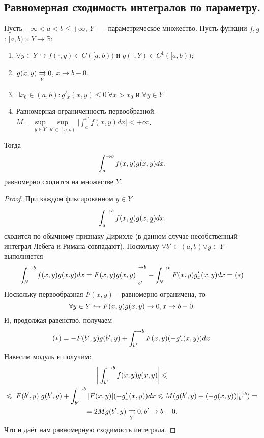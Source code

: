 \subsection{Равномерная сходимость интегралов по параметру.}
\begin{theorem}
    Пусть $-\infty <  a <  b \leq + \infty$, $Y$~---~параметрическое множество.
    Пусть функции $f, g$: $[a, b) \times Y \to \mathbb{R}$:
    \begin{enumerate}
        \item $\forall y \in Y \hookrightarrow f(\cdot, y) \in C([a, b))$ и $g(\cdot, Y) \in C^1([a, b))$;
        \item $g(x, y) \underset{Y}{\rightrightarrows} 0$, $x \rightarrow b - 0$.
        \item $\exists x_0 \in (a, b): g'_x(x, y) \leq 0\  \forall x > x_0$ и $\forall y \in Y$.
        \item Равномерная ограниченность первообразной: $\displaystyle M = \sup\limits_{y \in Y} \sup\limits_{b' \in (a, b)} \biggr|\int_a^{b'}f(x, y)dx\biggr| < +\infty$.
    \end{enumerate}
    Тогда \[
              \int_a^{\rightarrow b} f(x, y)g(x, y)dx.
    \]
    равномерно сходится на множестве $Y$.
\end{theorem}
\begin{proof}
    При каждом фиксированном $\underline{y} \in Y$
    \[
        \int_a^{\rightarrow b}f(x, \underline{y})g(x, \underline{y})dx.
    \]
    сходится по обычному признаку Дирихле (в данном случае несобственный интеграл Лебега и Римана совпадают).
    Поскольку $\forall b' \in (a, b) \forall y \in Y$ выполняется
    \[
        \int_{b'}^{\rightarrow b} f(x, y)g(x. y)dx = F(x, y)g(x, y)\biggr|_{b'}^{\rightarrow b} - \int_{b'}^{\rightarrow b}F(x, y)g'_x(x, y)dx = (*)
    \]
    Поскольку первообразная $F(x, y)$ -- равномерно ограничена, то
    \[
        \forall y \in Y \hookrightarrow F(x, y)g(x, y) \rightarrow 0, x \rightarrow b - 0.
    \]
    И, продолжая равенство, получаем
    \[
        (*) = -F(b', y)g(b', y) + \int_{b'}^{\rightarrow b} F(x, y)(-g'_x(x, y))dx.
    \]
    Навесим модуль и получим:
    \begin{multline*}
        \biggr|\int_{b'}^{\rightarrow b} f(x, y)g(x, y) \biggr| \leqslant \\ \leqslant
        |F(b', y)|g(b', y) + \int_{b'}^{\rightarrow b}  |F(x, y)|(-g'_x(x, y))dx \leqslant M(g(b', y) + (-g(x, y))|^{\rightarrow b}_{b'}) = \\ = 2M g(b', y) \underset{Y}{\rightrightarrows} 0, b' \rightarrow b - 0.
    \end{multline*}
    Что и даёт нам равномерную сходимость интеграла.
\end{proof}

